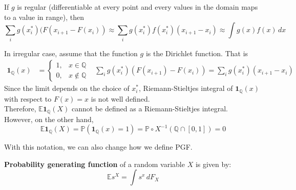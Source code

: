 \documentclass{huhtakm-template-book}
\newcommand{\prob}{\mathbb{P}}
\newcommand{\expect}{\mathbb{E}}
\begin{document}
\begin{eg}
    If $g$ is regular (differentiable at every point and every values in the domain maps to a value in range), then
    \begin{equation*}
        \sum_{i}g(x_{i}^{*})(F(x_{i+1}-F(x_{i}))\approx\sum_{i}g(x_{i}^{*})f(x_{i}^{*})(x_{i+1}-x_{i})\approx\int g(x)f(x)\,dx
    \end{equation*}
\end{eg}
\begin{eg}
    In irregular case, assume that the function $g$ is the Dirichlet function. That is
    \begin{align*}
        \mathbf{1}_{\mathbb{Q}}(x)&=\begin{cases}
            1, &x\in\mathbb{Q}\\
            0, &x\not\in\mathbb{Q}
        \end{cases} & \sum_{i}g(x_{i}^{*})(F(x_{i+1})-F(x_{i}))=\sum_{i}g(x_{i}^{*})(x_{i+1}-x_{i})
    \end{align*}
    Since the limit depends on the choice of $x_{i}^{*}$, Riemann-Stieltjes integral of $\mathbf{1}_{\mathbb{Q}}(x)$ with respect to $F(x)=x$ is not well defined.\\
    Therefore, $\expect\mathbf{1}_{\mathbb{Q}}(X)$ cannot be defined as a Riemann-Stieltjes integral.\\
    However, on the other hand,
    \begin{equation*}
        \expect\mathbf{1}_{\mathbb{Q}}(X)=\prob(\mathbf{1}_{\mathbb{Q}}(x)=1)=\prob\circ X^{-1}(\mathbb{Q}\cap[0,1])=0
    \end{equation*}
\end{eg}
\newpage
With this notation, we can also change how we define PGF.
\begin{defn}
    \textbf{Probability generating function} of a random variable $X$ is given by:
    \begin{equation*}
        \expect s^{X}=\int s^{x}\,dF_{X}
    \end{equation*}
\end{defn}
\end{document}
